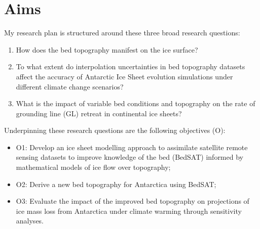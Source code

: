 \section{Aims}
 My research plan is structured around these three broad research questions:
\begin{enumerate}
    \item How does the bed topography manifest on the ice surface?
    \item To what extent do interpolation uncertainties in bed topography datasets affect the accuracy of Antarctic Ice Sheet evolution simulations under different climate change scenarios?
    \item What is the impact of variable bed conditions and topography on the rate of grounding line (GL) retreat in continental ice sheets?
\end{enumerate}
Underpinning these research questions are the following objectives (O):
\begin{itemize}
    \item{O1:} Develop an ice sheet modelling approach to assimilate satellite remote sensing datasets to improve knowledge of the bed (BedSAT) informed by mathematical models of ice flow over topography;
    \item{O2:} Derive a new bed topography for Antarctica using BedSAT;
    \item{O3:} Evaluate the impact of the improved bed topography on projections of ice mass loss from Antarctica under climate warming through sensitivity analyses. 
\end{itemize}